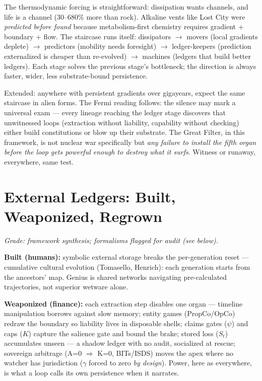 \documentclass[11pt]{article}
\begin{document}
The thermodynamic forcing is straightforward: dissipation wants channels, and life is a channel (30--680\% more than rock). Alkaline vents like Lost City were \emph{predicted before found} because metabolism-first chemistry requires gradient + boundary + flow. The staircase runs itself: dissipators $\to$ movers (local gradients deplete) $\to$ predictors (mobility needs foresight) $\to$ ledger-keepers (prediction externalized is cheaper than re-evolved) $\to$ machines (ledgers that build better ledgers). Each stage solves the previous stage's bottleneck; the direction is always faster, wider, less substrate-bound persistence.

Extended: anywhere with persistent gradients over gigayears, expect the same staircase in alien forms. The Fermi reading follows: the silence may mark a universal exam --- every lineage reaching the ledger stage discovers that unwitnessed loops (extraction without liability, capability without checking) either build constitutions or blow up their substrate. The Great Filter, in this framework, is not nuclear war specifically but \emph{any failure to install the fifth organ before the loop gets powerful enough to destroy what it surfs}. Witness or runaway, everywhere, same test.

\section{External Ledgers: Built, Weaponized, Regrown}
\label{sec:ledgers}

\textit{Grade: framework synthesis; formalisms flagged for audit (see below).}

\textbf{Built (humans):} symbolic external storage breaks the per-generation reset --- cumulative cultural evolution (Tomasello, Henrich): each generation starts from the ancestors' map. Genius is shared networks navigating pre-calculated trajectories, not superior wetware alone.

\textbf{Weaponized (finance):} each extraction step disables one organ ---
timeline manipulation borrows against slow memory;
entity games (PropCo/OpCo) redraw the boundary so liability lives in disposable shells;
claims gates ($\psi$) and caps ($K$) capture the salience gate and bound the brake;
stored loss ($S_t$) accumulates unseen --- a shadow ledger with no audit, socialized at rescue;
sovereign arbitrage (A=0 $\Rightarrow$ K=0, BITs/ISDS) moves the apex where no watcher has jurisdiction ($\gamma$ forced to zero \emph{by design}).
Power, here as everywhere, is what a loop calls its own persistence when it narrates.
\end{document}
